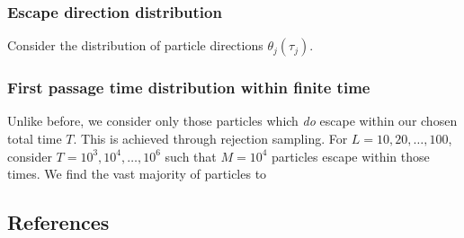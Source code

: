 \documentclass[a4paper,12pt]{article}
\begin{document}
\subsubsection{Escape direction distribution}
Consider the distribution of particle directions $\theta_j(\tau_j)$.


\subsubsection{First passage time distribution within finite time}
Unlike before, we consider only those particles which \emph{do} escape within our chosen total time $T$. This is achieved through rejection sampling. For $L = 10,20,\dots,100$, consider $T = 10^3, 10^4, \dots, 10^6$ such that $M = 10^4$ particles escape within those times. We find the vast majority of particles to 





\cleardoublepage
\subsection*{References}
\printbibliography[heading=none] %

\end{document}

